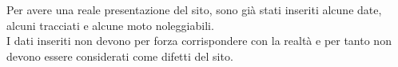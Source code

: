 Per avere una reale presentazione del sito, sono già stati inseriti alcune date, alcuni tracciati e alcune moto noleggiabili.\\
I dati inseriti non devono per forza corrispondere con la realtà e per tanto non devono essere considerati come difetti del sito.